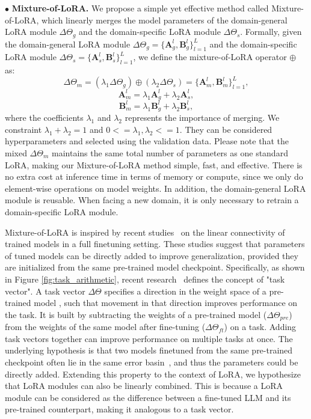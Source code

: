 \noindent$\bullet$ \quad\textbf{Mixture-of-LoRA.} We propose a simple yet effective method called Mixture-of-LoRA, which linearly merges the model parameters of the domain-general LoRA module $\Delta\Theta_g$ and the domain-specific LoRA module $\Delta\Theta_s$.
Formally, given the domain-general LoRA module $\Delta\Theta_g =\{\boldsymbol{A}_g^l,\boldsymbol{B}_g^l\}_{l=1}^L$ and the domain-specific LoRA module $\Delta\Theta_s=\{\boldsymbol{A}_s^l,\boldsymbol{B}_s^l\}_{l=1}^L$, we define the mixture-of-LoRA operator $\oplus$ as:
\begin{equation}
    \Delta\Theta_m = (\lambda_1\Delta\Theta_g) \oplus (\lambda_2\Delta\Theta_s) = \{\boldsymbol{A}_m^l, \boldsymbol{B}_m^l\}_{l=1}^L,
\label{eq:merge}
\end{equation}
\begin{equation}
    \boldsymbol{A}_m^l = \lambda_1\boldsymbol{A}_g^l + \lambda_2\boldsymbol{A}_s^l,
\end{equation}
\begin{equation}
    \boldsymbol{B}_m^l = \lambda_1\boldsymbol{B}_g^l + \lambda_2\boldsymbol{B}_s^l,
\end{equation}
where the coefficients $\lambda_1$ and $\lambda_2$ represents the importance of merging. We constraint $\lambda_1 + \lambda_2=1$ and $0 <= \lambda_1,\lambda_2 <=1$. They can be considered hyperparameters and selected using the validation data. Please note that the mixed $\Delta\Theta_m$ maintains the same total number of parameters as one standard LoRA, making our Mixture-of-LoRA method simple, fast, and effective. There is no extra cost at inference time in terms of memory or compute, since we only do element-wise operations on model weights. In addition, the domain-general LoRA module is reusable. When facing a new domain, it is only necessary to retrain a domain-specific LoRA module.

Mixture-of-LoRA is inspired by recent studies~\cite{ilharco2023editing,wortsman2022model} on the linear connectivity of trained models in a full finetuning setting. These studies suggest that parameters of tuned models can be directly added to improve generalization, provided they are initialized from the same pre-trained model checkpoint. 
Specifically, as shown in Figure \ref{fig:task_arithmetic}, recent research~\cite{ilharco2023editing} defines the concept of "task vector". A task vector $\Delta\Theta$ specifies a direction in the weight space of a pre-trained model , such that movement in that direction improves performance on the task. It is built by subtracting the weights of a pre-trained model ($\Delta\Theta_{pre}$) from the weights of the same model after fine-tuning ($\Delta\Theta_{ft}$) on a task. Adding task vectors together can improve performance on multiple tasks at once.
The underlying hypothesis is that two models finetuned from the same pre-trained checkpoint often lie in the same error basin~\cite{neyshabur2020being,zhang2023composing}, and thus the parameters could be directly added.
Extending this property to the context of LoRA, we hypothesize that LoRA modules can also be linearly combined. This is because a LoRA module can be considered as the difference between a fine-tuned LLM and its pre-trained counterpart, making it analogous to a task vector.


